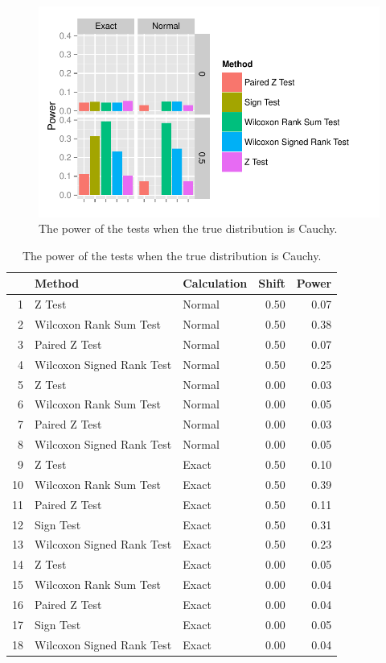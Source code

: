 \documentclass[11pt]{article}
\begin{document}
\begin{figure}[H]
	\centering
	\includegraphics[scale = 1]{part3.pdf}
	\caption{The power of the tests when the true distribution is Cauchy.}
	\label{fig:part3}
\end{figure}

\begin{table}[ht]
	\centering
	\begin{tabular}{rllrr}
		\hline
		& Method & Calculation & Shift & Power \\ 
		\hline
		1 & Z Test & Normal & 0.50 & 0.07 \\ 
		2 & Wilcoxon Rank Sum Test & Normal & 0.50 & 0.38 \\ 
		3 & Paired Z Test & Normal & 0.50 & 0.07 \\ 
		4 & Wilcoxon Signed Rank Test & Normal & 0.50 & 0.25 \\ 
		5 & Z Test & Normal & 0.00 & 0.03 \\ 
		6 & Wilcoxon Rank Sum Test & Normal & 0.00 & 0.05 \\ 
		7 & Paired Z Test & Normal & 0.00 & 0.03 \\ 
		8 & Wilcoxon Signed Rank Test & Normal & 0.00 & 0.05 \\ 
		9 & Z Test & Exact & 0.50 & 0.10 \\ 
		10 & Wilcoxon Rank Sum Test & Exact & 0.50 & 0.39 \\ 
		11 & Paired Z Test & Exact & 0.50 & 0.11 \\ 
		12 & Sign Test & Exact & 0.50 & 0.31 \\ 
		13 & Wilcoxon Signed Rank Test & Exact & 0.50 & 0.23 \\ 
		14 & Z Test & Exact & 0.00 & 0.05 \\ 
		15 & Wilcoxon Rank Sum Test & Exact & 0.00 & 0.04 \\ 
		16 & Paired Z Test & Exact & 0.00 & 0.04 \\ 
		17 & Sign Test & Exact & 0.00 & 0.05 \\ 
		18 & Wilcoxon Signed Rank Test & Exact & 0.00 & 0.04 \\ 
		\hline
	\end{tabular}
	\caption{The power of the tests when the true distribution is Cauchy.}
	\label{tab:part3}
\end{table}
\end{document}
